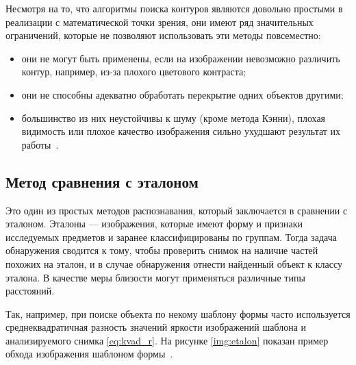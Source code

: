 Несмотря на то, что алгоритмы поиска контуров являются довольно простыми в реализации с математической точки зрения, они имеют ряд значительных ограничений, которые не позволяют использовать эти методы повсеместно:
\begin{itemize}[label=---]
    \item они не могут быть применены, если на изображении невозможно различить контур, например, из-за плохого цветового контраста;
    \item они не способны адекватно обработать перекрытие одних объектов другими;
    \item большинство из них неустойчивы к шуму (кроме метода Кэнни), плохая видимость или плохое качество изображения сильно ухудшают результат их работы~\cite{comp_vision}.
\end{itemize}



\subsection{Метод сравнения с эталоном}
Это один из простых методов распознавания, который заключается в сравнении с эталоном. Эталоны --- изображения, которые имеют форму и признаки исследуемых предметов и заранее классифицированы по группам. Тогда задача обнаружения сводится к тому, чтобы проверить снимок на наличие частей похожих на эталон, и в случае обнаружения отнести найденный объект к классу эталона. В качестве меры близости могут применяться различные типы расстояний.

Так, например, при поиске объекта по некому шаблону формы часто используется среднеквадратичная разность значений яркости изображений шаблона и анализируемого снимка \ref{eq:kvad_r}. На рисунке \ref{img:etalon} показан пример обхода изображения шаблоном формы~\cite{etalon}.

